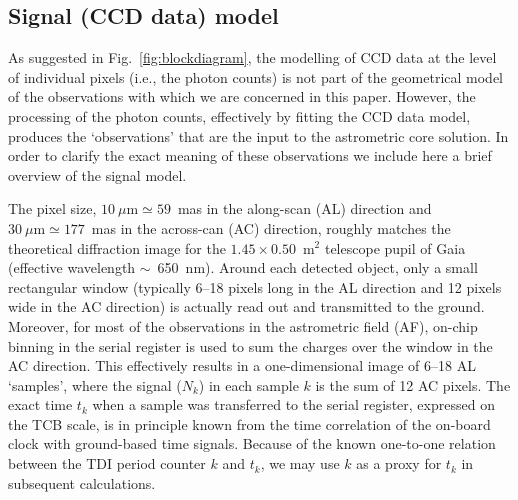 \documentclass[structabstract]{aa}
\begin{document}
\subsection{Signal (CCD data) model} \label{sec:signalmodel}

As suggested in Fig.~\ref{fig:blockdiagram}, the modelling of CCD data
at the level of individual pixels (i.e., the photon counts) is not part of the 
geometrical model of the observations with which we are concerned in 
this paper. However, the processing of the photon counts, effectively
by fitting the CCD data model, produces the `observations'
that are the input to the astrometric core solution. In order
to clarify the exact meaning of these observations we include here 
a brief overview of the signal model.
  
The pixel size, $10~\mu\mbox{m}\simeq 59$~mas in the along-scan
(AL) direction and $30~\mu\mbox{m}\simeq 177$~mas in the across-can
(AC) direction, roughly matches the theoretical diffraction image
for the $1.45\times 0.50$~m$^2$ telescope pupil of Gaia (effective
wavelength $\sim$~650~nm). Around each
detected object, only a small rectangular window (typically 6--18 pixels
long in the AL direction and 12 pixels wide in the AC direction) is
actually read out and transmitted to the ground. Moreover, for most of
the observations in the astrometric field (AF), on-chip binning in the
serial register is used to sum the charges over the window in the
AC direction. This effectively results in a one-dimensional image of
6--18 AL `samples', where the signal ($N_k$) in each sample $k$ is the 
sum of 12 AC pixels.
The exact time $t_k$ when a sample was transferred to the serial register,
expressed on the TCB scale, is in principle known from the time
correlation of the on-board clock with ground-based time signals.
Because of the known one-to-one relation between the TDI period counter
$k$ and $t_k$, we may use $k$ as a proxy for $t_k$ in subsequent
calculations.
\end{document}
